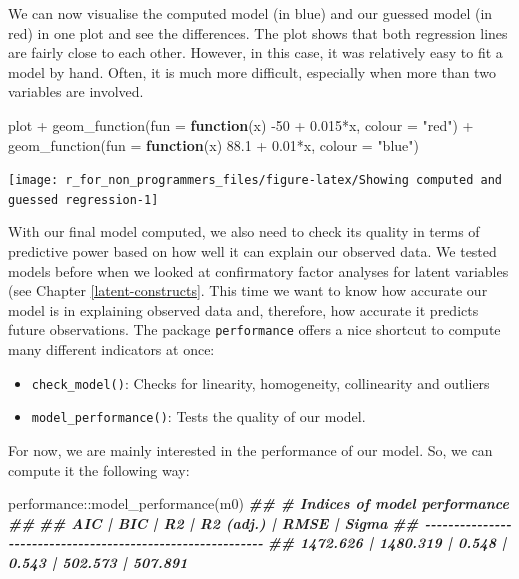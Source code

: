 \documentclass[
]{book}
\newenvironment{Shaded}{\begin{snugshade}}{\end{snugshade}}
\newcommand{\AttributeTok}[1]{\textcolor[rgb]{0.77,0.63,0.00}{#1}}
\newcommand{\ControlFlowTok}[1]{\textcolor[rgb]{0.13,0.29,0.53}{\textbf{#1}}}
\newcommand{\DecValTok}[1]{\textcolor[rgb]{0.00,0.00,0.81}{#1}}
\newcommand{\DocumentationTok}[1]{\textcolor[rgb]{0.56,0.35,0.01}{\textbf{\textit{#1}}}}
\newcommand{\FloatTok}[1]{\textcolor[rgb]{0.00,0.00,0.81}{#1}}
\newcommand{\FunctionTok}[1]{\textcolor[rgb]{0.00,0.00,0.00}{#1}}
\newcommand{\NormalTok}[1]{#1}
\newcommand{\SpecialCharTok}[1]{\textcolor[rgb]{0.00,0.00,0.00}{#1}}
\newcommand{\StringTok}[1]{\textcolor[rgb]{0.31,0.60,0.02}{#1}}
\begin{document}
We can now visualise the computed model (in blue) and our guessed model (in red) in one plot and see the differences. The plot shows that both regression lines are fairly close to each other. However, in this case, it was relatively easy to fit a model by hand. Often, it is much more difficult, especially when more than two variables are involved.

\begin{Shaded}
\begin{Highlighting}[]
\NormalTok{plot }\SpecialCharTok{+}
  \FunctionTok{geom\_function}\NormalTok{(}\AttributeTok{fun =} \ControlFlowTok{function}\NormalTok{(x) }\SpecialCharTok{{-}}\DecValTok{50} \SpecialCharTok{+} \FloatTok{0.015}\SpecialCharTok{*}\NormalTok{x, }\AttributeTok{colour =} \StringTok{"red"}\NormalTok{) }\SpecialCharTok{+}
    \FunctionTok{geom\_function}\NormalTok{(}\AttributeTok{fun =} \ControlFlowTok{function}\NormalTok{(x) }\FloatTok{88.1} \SpecialCharTok{+} \FloatTok{0.01}\SpecialCharTok{*}\NormalTok{x, }\AttributeTok{colour =} \StringTok{"blue"}\NormalTok{)}
\end{Highlighting}
\end{Shaded}

\begin{center}\texttt{[image: r\_for\_non\_programmers\_files/figure-latex/Showing computed and guessed regression-1]} \end{center}

With our final model computed, we also need to check its quality in terms of predictive power based on how well it can explain our observed data. We tested models before when we looked at confirmatory factor analyses for latent variables (see Chapter \ref{latent-constructs}. This time we want to know how accurate our model is in explaining observed data and, therefore, how accurate it predicts future observations. The package \texttt{performance} offers a nice shortcut to compute many different indicators at once:

\begin{itemize}
\item
  \texttt{check\_model()}: Checks for linearity, homogeneity, collinearity and outliers
\item
  \texttt{model\_performance()}: Tests the quality of our model.
\end{itemize}

For now, we are mainly interested in the performance of our model. So, we can compute it the following way:

\begin{Shaded}
\begin{Highlighting}[]
\NormalTok{performance}\SpecialCharTok{::}\FunctionTok{model\_performance}\NormalTok{(m0)}
\DocumentationTok{\#\# \# Indices of model performance}
\DocumentationTok{\#\# }
\DocumentationTok{\#\# AIC      |      BIC |    R2 | R2 (adj.) |    RMSE |   Sigma}
\DocumentationTok{\#\# {-}{-}{-}{-}{-}{-}{-}{-}{-}{-}{-}{-}{-}{-}{-}{-}{-}{-}{-}{-}{-}{-}{-}{-}{-}{-}{-}{-}{-}{-}{-}{-}{-}{-}{-}{-}{-}{-}{-}{-}{-}{-}{-}{-}{-}{-}{-}{-}{-}{-}{-}{-}{-}{-}{-}{-}{-}{-}{-}}
\DocumentationTok{\#\# 1472.626 | 1480.319 | 0.548 |     0.543 | 502.573 | 507.891}
\end{Highlighting}
\end{Shaded}
\end{document}
